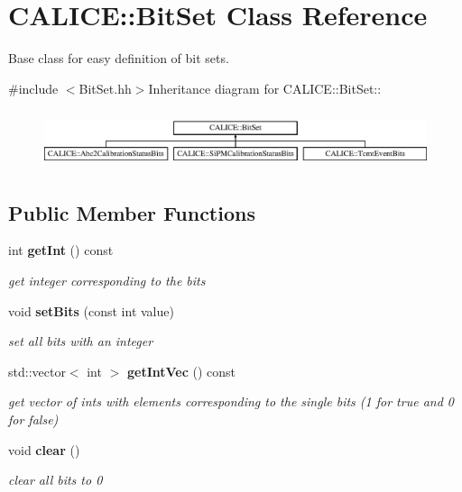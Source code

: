 \section{CALICE::BitSet Class Reference}
\label{classCALICE_1_1BitSet}


Base class for easy definition of bit sets.  


{\ttfamily \#include $<$BitSet.hh$>$}Inheritance diagram for CALICE::BitSet::\begin{figure}[H]
\begin{center}
\leavevmode
\includegraphics[height=1.72839cm]{classCALICE_1_1BitSet}
\end{center}
\end{figure}
\subsection*{Public Member Functions}
\begin{DoxyCompactItemize}
\item 
int {\bf getInt} () const 
\begin{DoxyCompactList}\small\item\em get integer corresponding to the bits \item\end{DoxyCompactList}\item 
void {\bf setBits} (const int value)
\begin{DoxyCompactList}\small\item\em set all bits with an integer \item\end{DoxyCompactList}\item 
std::vector$<$ int $>$ {\bf getIntVec} () const 
\begin{DoxyCompactList}\small\item\em get vector of ints with elements corresponding to the single bits (1 for true and 0 for false) \item\end{DoxyCompactList}\item 
void {\bf clear} ()\label{classCALICE_1_1BitSet_abd6be6d671e597c9c04afd73d25f7b6a}

\begin{DoxyCompactList}\small\item\em clear all bits to 0 \item\end{DoxyCompactList}\end{DoxyCompactItemize}
